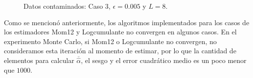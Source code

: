 \begin{figure}[htb]
	\caption{\label{Caso3L8}\small Datos contaminados: Caso $3$, $\epsilon=0.005$ y $ L=8$.}
\end{figure}

Como se mencionó anteriormente, los algoritmos implementados para los casos de los estimadores Mom12 y Logcumulante no convergen en algunos casos. En el experimento Monte Carlo, si Mom12 o  Logcumulante no convergen, no consideramos esta iteración al momento de estimar, por lo que la cantidad de elementos para calcular $\overline{\widehat{\alpha}}$, el sesgo y el error cuadrático medio es un poco menor que $1000$.

